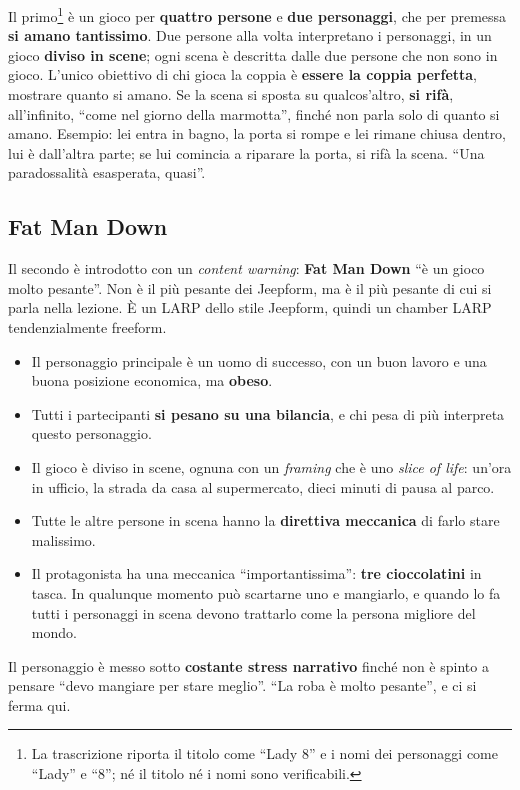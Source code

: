 Il primo\footnote{La trascrizione riporta il titolo come ``Lady 8'' e i nomi dei
personaggi come ``Lady'' e ``8''; né il titolo né i nomi sono verificabili.} è
un gioco per \textbf{quattro persone} e \textbf{due personaggi}, che per premessa
\textbf{si amano tantissimo}. Due persone alla volta interpretano i personaggi,
in un gioco \textbf{diviso in scene}; ogni scena è descritta dalle due persone che
non sono in gioco. L'unico obiettivo di chi gioca la coppia è \textbf{essere la
coppia perfetta}, mostrare quanto si amano. Se la scena si sposta su qualcos'altro,
\textbf{si rifà}, all'infinito, ``come nel giorno della marmotta'', finché non
parla solo di quanto si amano. Esempio: lei entra in bagno, la porta si rompe e
lei rimane chiusa dentro, lui è dall'altra parte; se lui comincia a riparare la
porta, si rifà la scena. ``Una paradossalità esasperata, quasi''.

\subsection{Fat Man Down}

Il secondo è introdotto con un \emph{content warning}: \textbf{Fat Man Down} ``è
un gioco molto pesante''. Non è il più pesante dei Jeepform, ma è il più pesante
di cui si parla nella lezione. È un LARP dello stile Jeepform, quindi un chamber
LARP tendenzialmente freeform.
\begin{itemize}
  \item Il personaggio principale è un uomo di successo, con un buon lavoro e
        una buona posizione economica, ma \textbf{obeso}.
  \item Tutti i partecipanti \textbf{si pesano su una bilancia}, e chi pesa di
        più interpreta questo personaggio.
  \item Il gioco è diviso in scene, ognuna con un \emph{framing} che è uno
        \emph{slice of life}: un'ora in ufficio, la strada da casa al
        supermercato, dieci minuti di pausa al parco.
  \item Tutte le altre persone in scena hanno la \textbf{direttiva meccanica} di
        farlo stare malissimo.
  \item Il protagonista ha una meccanica ``importantissima'': \textbf{tre
        cioccolatini} in tasca. In qualunque momento può scartarne uno e
        mangiarlo, e quando lo fa tutti i personaggi in scena devono trattarlo
        come la persona migliore del mondo.
\end{itemize}
Il personaggio è messo sotto \textbf{costante stress narrativo} finché non è
spinto a pensare ``devo mangiare per stare meglio''. ``La roba è molto pesante'',
e ci si ferma qui.

